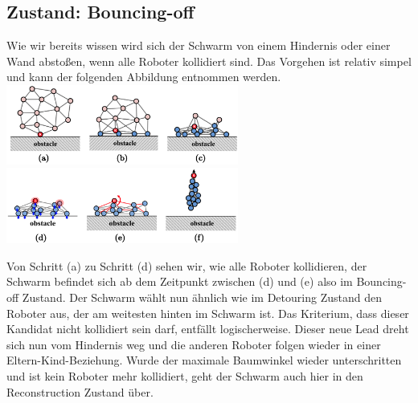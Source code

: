 \subsection{Zustand: Bouncing-off}

Wie wir bereits wissen wird sich der Schwarm von einem Hindernis oder einer Wand abstoßen, wenn alle
Roboter kollidiert sind. Das Vorgehen ist relativ simpel und kann der folgenden Abbildung entnommen werden.\\

\includegraphics[width=3in]{images/Screenshot 2023-02-20 at 1.32.00 PM.png}
\includegraphics[width=3in]{images/Screenshot 2023-02-20 at 1.32.24 PM.png}

Von Schritt (a) zu Schritt (d) sehen wir, wie alle Roboter kollidieren, der Schwarm befindet sich ab dem
Zeitpunkt zwischen (d) und (e) also im Bouncing-off Zustand. Der Schwarm wählt nun ähnlich wie im Detouring
Zustand den Roboter aus, der am weitesten hinten im Schwarm ist. Das Kriterium, dass dieser Kandidat nicht
kollidiert sein darf, entfällt logischerweise. Dieser neue Lead dreht sich nun vom Hindernis weg und die
anderen Roboter folgen wieder in einer Eltern-Kind-Beziehung. Wurde der maximale Baumwinkel wieder
unterschritten und ist kein Roboter mehr kollidiert, geht der Schwarm auch hier in den Reconstruction Zustand
über.